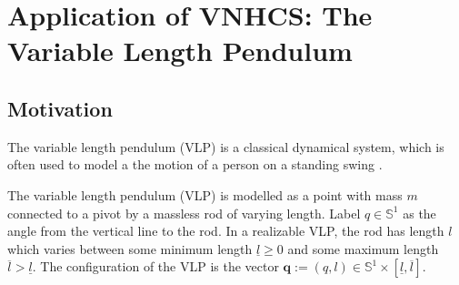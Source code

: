 
\chapter{Application of VNHCS: The Variable Length Pendulum}\label{sec:vlp}
\section{Motivation}
The variable length pendulum (VLP) is a classical dynamical system, which is often
used to model a the motion of a person on a standing swing
\cite{dynamics_periodic_vlp,pumping_swing_standing_squatting,how_to_pump_a_swing}.

The variable length pendulum (VLP) is modelled as a point with mass \(m\)
connected to a pivot by a massless rod of varying length. Label
\(q \in \mathbb{S}^1\) as the angle from the vertical line to the rod. In a
realizable VLP, the rod  has length \(l\) which varies between some minimum
length \(\underline{l} \geq 0\) and some maximum length 
\(\overline{l} > \underline{l}\). The configuration of the VLP is the vector
\(\mathbf{q} := (q,l) \in \mathbb{S}^1 \times [\underline{l},\overline{l}]\).

